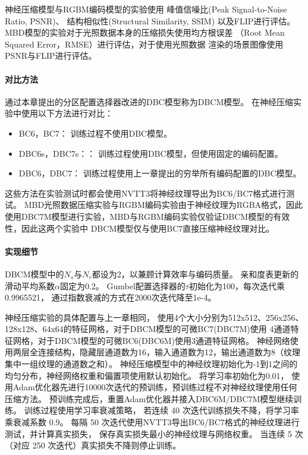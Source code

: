 神经压缩模型与RGBM编码模型的实验使用
峰值信噪比(Peak Signal-to-Noise Ratio, PSNR)、
结构相似性\cite{wang2004image}(Structural Similarity, SSIM)
以及FLIP\cite{andersson2020flip}进行评估。
MBD模型的实验对于光照数据本身的压缩损失使用均方根误差
（Root Mean Squared Error，RMSE）进行评估，对于使用光照数据
渲染的场景图像使用PSNR与FLIP进行评估。

\paragraph{对比方法}

通过本章提出的分区配置选择器改进的DBC模型称为DBCM模型。
在神经压缩实验中使用以下方法进行对比：

\begin{itemize}
    \item BC6，BC7： 训练过程不使用DBC模型。
    \item DBC6s，DBC7s：： 训练过程使用DBC模型，但使用固定的编码配置。
    \item DBC6，DBC7： 训练过程使用上一章提出的穷举所有编码配置的DBC模型。    
\end{itemize}

这些方法在实验测试时都会使用NVTT3将神经纹理导出为BC6/BC7格式进行测试。
MBD光照数据压缩实验与RGBM编码实验由于神经纹理为RGBA格式，因此
使用DBC7M模型进行实验，MBD与RGBM编码实验仅验证DBCM模型的有效性，因此这两个实验中
DBCM模型仅与使用BC7直接压缩神经纹理对比。

\paragraph{实现细节}

DBCM模型中的$N_s$与$N_r$都设为2，以兼顾计算效率与编码质量。
亲和度表更新的滑动平均系数$\alpha$固定为0.2。
Gumbel配置选择器的$\tau$初始化为100，每次迭代乘0.9965521，
通过指数衰减的方式在2000次迭代降至1e-4。

神经压缩实验的具体配置与上一章相同，
使用4个大小分别为512x512、256x256、128x128、64x64的特征网格，对于DBCM模型的可微BC7(DBC7M)使用
4通道特征网格，对于DBCM模型的可微BC6(DBC6M)使用3通道特征网格。
神经网络使用两层全连接结构，隐藏层通道数为16，输入通道数为12，输出通道数为8（纹理集中一组纹理的通道数之和）。
神经压缩模型中的神经纹理初始化为-1到1之间的均匀分布，神经网络权重和偏置项使用默认初始化。
将学习率初始化为0.01，
使用Adam优化器先进行10000次迭代的预训练，预训练过程不对神经纹理使用任何压缩方法。
预训练完成后，重置Adam优化器并接入DBC6M/DBC7M模型继续训练。
训练过程使用学习率衰减策略，
若连续 40 次迭代训练损失不降，将学习率乘衰减系数 0.9。
每隔 50 次迭代使用NVTT3导出BC6/BC7格式的神经纹理进行测试，并计算真实损失，
保存真实损失最小的神经纹理与网络权重。
当连续 5 次（对应 250 次迭代）真实损失不降则停止训练。

